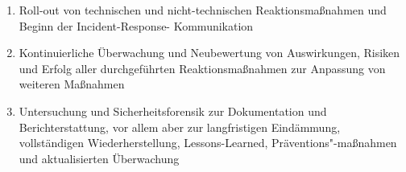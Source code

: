 \begin{enumerate}
    \item Roll-out von technischen und nicht-technischen Reaktionsmaßnahmen und Beginn der Incident-Response-
    Kommunikation
    \item Kontinuierliche Überwachung und Neubewertung von Auswirkungen, Risiken und Erfolg aller 
    durchgeführten Reaktionsmaßnahmen zur Anpassung von weiteren Maßnahmen
    \item Untersuchung und Sicherheitsforensik zur Dokumentation und Berichterstattung, vor allem aber zur 
    langfristigen Eindämmung, vollständigen Wiederherstellung, Lessons-Learned, Präventions"-maßnahmen und 
    aktualisierten Überwachung
\end{enumerate}